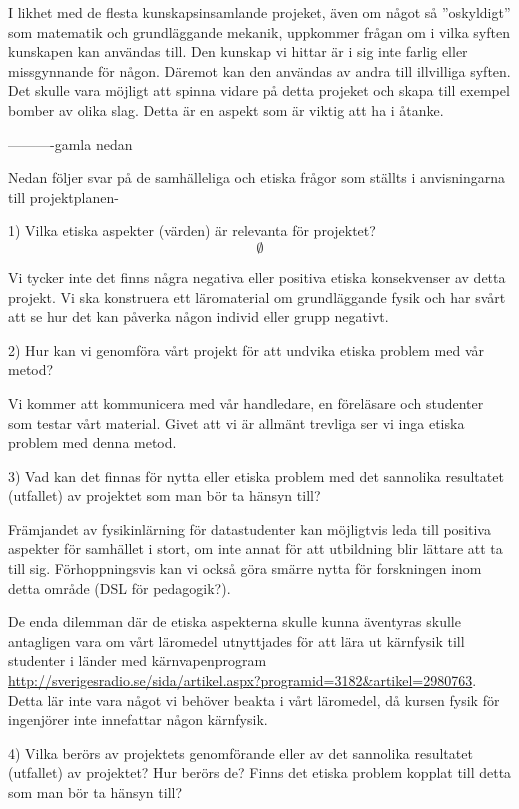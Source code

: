\documentclass[12pt,a4paper]{article}
\begin{document}
I likhet med de flesta kunskapsinsamlande projeket, även om något så ''oskyldigt'' som matematik och grundläggande mekanik, uppkommer frågan om i vilka syften kunskapen kan användas till. Den kunskap vi hittar är i sig inte farlig eller missgynnande för någon. Däremot kan den användas av andra till illvilliga syften. Det skulle vara möjligt att spinna vidare på detta projeket och skapa till exempel bomber av olika slag. Detta är en aspekt som är viktig att ha i åtanke.




----------gamla nedan

Nedan följer svar på de samhälleliga och etiska frågor som ställts i anvisningarna till projektplanen-

1) Vilka etiska  aspekter (värden) är relevanta för projektet?
\[
\emptyset
\]

Vi tycker inte det finns några negativa eller positiva etiska konsekvenser av detta projekt. Vi ska konstruera ett läromaterial om grundläggande fysik och har svårt att se hur det kan påverka någon individ eller grupp negativt.

2) Hur kan vi genomföra vårt projekt för att undvika etiska problem med vår metod?

Vi kommer att kommunicera med vår handledare, en föreläsare och studenter som testar vårt material. Givet att vi är allmänt trevliga ser vi inga etiska problem med denna metod.

3) Vad kan det finnas för nytta eller etiska problem med det sannolika resultatet (utfallet) av projektet som man bör ta hänsyn till?

Främjandet av fysikinlärning för datastudenter kan möjligtvis leda till positiva aspekter för samhället i stort, om inte annat för att utbildning blir lättare att ta till sig. Förhoppningsvis kan vi också göra smärre nytta för forskningen inom detta område (DSL för pedagogik?).

De enda dilemman där de etiska aspekterna skulle kunna äventyras skulle antagligen vara om vårt läromedel utnyttjades för att lära ut kärnfysik till studenter i länder med kärnvapenprogram \url{http://sverigesradio.se/sida/artikel.aspx?programid=3182&artikel=2980763}.
   Detta lär inte vara något vi behöver beakta i vårt läromedel, då kursen fysik för ingenjörer inte innefattar någon kärnfysik.

4)  Vilka berörs av projektets genomförande eller av det sannolika resultatet (utfallet) av projektet? Hur berörs de? Finns det etiska problem kopplat till detta som man bör ta hänsyn till?
\end{document}
